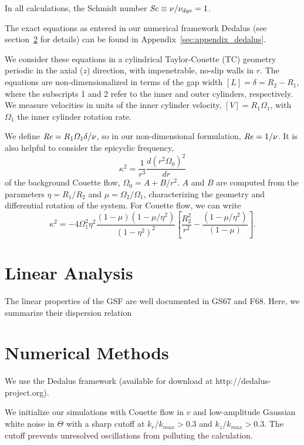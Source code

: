 \documentclass{jfm}
\begin{document}
In all calculations, the Schmidt number $\mbox{\textit{Sc}} \equiv \nu/\nu_{dye} = 1$.

The exact equations as entered in our numerical framework Dedalus (see
section~\ref{sec:numerical} for details) can be found in
Appendix~\ref{sec:appendix_dedalus}.

We consider these equations in a cylindrical Taylor-Couette (TC) geometry
periodic in the axial ($z$) direction, with impenetrable, no-slip
walls in $r$. The equations are non-dimensionalized in terms of the
gap width $[L] = \delta = R_2 -R_1$, where the subscripts 1 and 2
refer to the inner and outer cylinders, respectively. We measure
velocities in units of the inner cylinder velocity,
$[V] = R_1 \Omega_1$, with $\Omega_1$ the inner cylinder rotation
rate. 

We define $\mbox{\textit{Re}} = R_1 \varOmega_1 \delta/\nu$, so in our non-dimensional
formulation, $\mbox{\textit{Re}} = 1/\nu$. It is also helpful to consider the epicyclic frequency, 
\begin{equation}
  \label{eq:epicyclic_freq}
\kappa^2 = \frac{1}{r^3}\frac{d (r^2 \Omega_0)^2}{dr}
\end{equation}
of the background Couette flow, $\Omega_0 = A + B/r^2$. $A$ and $B$
are computed from the parameters $\eta = R_1/R_2$ and
$\mu = \Omega_2/\Omega_1$, characterizing the geometry and
differential rotation of the system. For Couette flow, we can write 
\begin{equation}
  \label{eq:kappa_couette}
  \kappa^2 = - 4 \Omega_1^2 \eta^2
  \frac{(1-\mu)(1-\mu/\eta^2)}{(1-\eta^2)^2}
  \left[\frac{R_2^2}{r^2} -\frac{(1-\mu/\eta^2)}{(1-\mu)} \right].
\end{equation}

\section{Linear Analysis}
\label{sec:linear}
The linear properties of the GSF are well documented in GS67 and
F68. Here, we summarize their dispersion relation 

\section{Numerical Methods}
\label{sec:numerical}
We use the Dedalus framework (available for download at
http://dedalus-project.org). 

We initialize our simulations with Couette flow in $v$ and
low-amplitude Gaussian white noise in $\Theta$ with a sharp cutoff at
$k_r/k_{max} > 0.3$ and $k_z/k_{max} > 0.3$. The cutoff prevents
unresolved oscillations from polluting the calculation.
\end{document}
